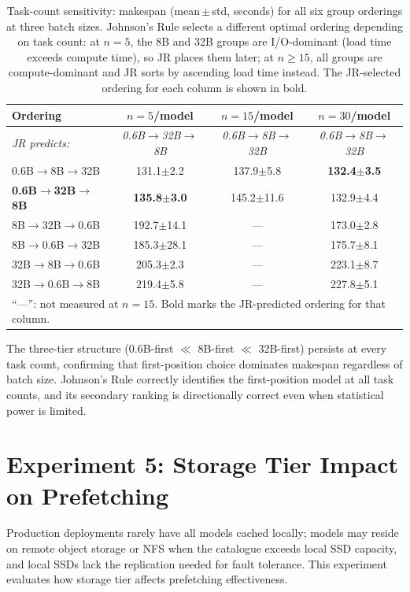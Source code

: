 \documentclass[logo,bsc,singlespacing,parskip,online]{infthesis}
\begin{document}
\begin{table}[htbp]
\centering
\caption{Task-count sensitivity: makespan (mean\,$\pm$\,std, seconds) for all six group orderings at three batch sizes. Johnson's Rule selects a different optimal ordering depending on task count: at $n=5$, the 8B and 32B groups are I/O-dominant (load time exceeds compute time), so JR places them later; at $n\geq15$, all groups are compute-dominant and JR sorts by ascending load time instead. The JR-selected ordering for each column is shown in bold.}
\label{tab:exp4_sensitivity}
\begin{tabular}{lccc}
\toprule
Ordering & $n=5$/model & $n=15$/model & $n=30$/model \\
\midrule
\textit{JR predicts:} & \textit{0.6B$\to$32B$\to$8B} & \textit{0.6B$\to$8B$\to$32B} & \textit{0.6B$\to$8B$\to$32B} \\
\midrule
0.6B$\to$8B$\to$32B & 131.1$\pm$2.2 & 137.9$\pm$5.8 & \textbf{132.4$\pm$3.5} \\
\textbf{0.6B$\to$32B$\to$8B} & \textbf{135.8$\pm$3.0} & 145.2$\pm$11.6 & 132.9$\pm$4.4 \\
8B$\to$32B$\to$0.6B & 192.7$\pm$14.1 & --- & 173.0$\pm$2.8 \\
8B$\to$0.6B$\to$32B & 185.3$\pm$28.1 & --- & 175.7$\pm$8.1 \\
32B$\to$8B$\to$0.6B & 205.3$\pm$2.3 & --- & 223.1$\pm$8.7 \\
32B$\to$0.6B$\to$8B & 219.4$\pm$5.8 & --- & 227.8$\pm$5.1 \\
\bottomrule
\multicolumn{4}{l}{\footnotesize ``---'': not measured at $n=15$. Bold marks the JR-predicted ordering for that column.}
\end{tabular}
\end{table}

The three-tier structure (0.6B-first $\ll$ 8B-first $\ll$ 32B-first) persists at every task count, confirming that first-position choice dominates makespan regardless of batch size. Johnson's Rule correctly identifies the first-position model at all task counts, and its secondary ranking is directionally correct even when statistical power is limited.


\section{Experiment 5: Storage Tier Impact on Prefetching}

Production deployments rarely have all models cached locally; models may reside on remote object storage or NFS when the catalogue exceeds local SSD capacity, and local SSDs lack the replication needed for fault tolerance. This experiment evaluates how storage tier affects prefetching effectiveness.
\end{document}
